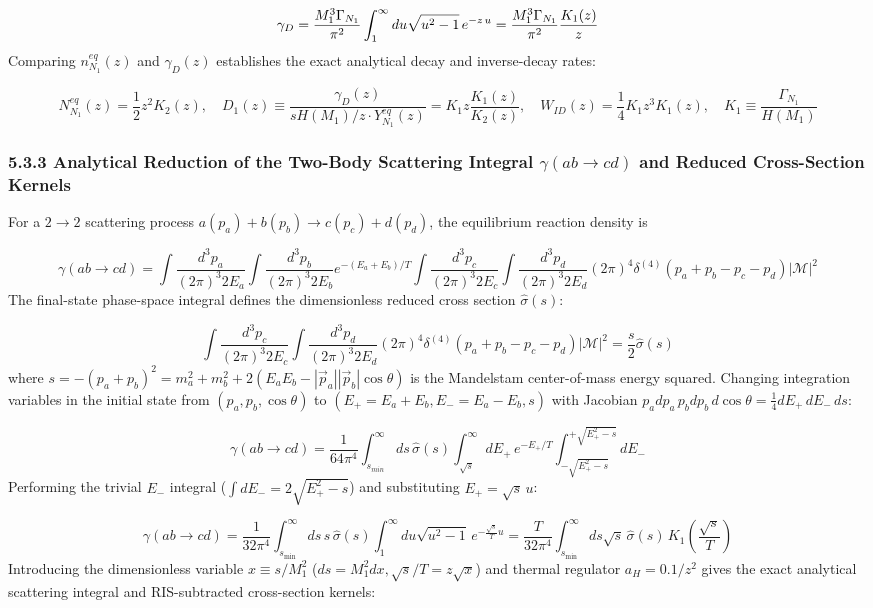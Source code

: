 \documentclass[aps,prd,onecolumn,superscriptaddress,nofootinbib,longbibliography,10pt]{revtex4-2}
\begin{document}
  \[ \gamma_D = \frac{M_1^3\Gamma_{N_1}}{\pi^2}\int_1^\infty du\sqrt{u^2 - 1}\,e^{{\small -z\,u}} = \frac{M_1^3\Gamma_{N_1}}{\pi^2}\frac{K_1(z)}{z} \]
  Comparing \(n_{N_1}^{eq}(z)\) and \(\gamma_D(z)\) establishes the exact analytical decay and inverse-decay rates:


  \[ N_{N_1}^{eq}(z) = \frac{1}{2}z^2 K_2(z), \quad D_1(z) \equiv \frac{\gamma_D(z)}{sH(M_1)/z\cdot Y_{N_1}^{eq}(z)} = K_1 z\frac{K_1(z)}{K_2(z)}, \quad W_{ID}(z) = \frac{1}{4}K_1 z^3 K_1(z), \quad K_1 \equiv \frac{\Gamma_{N_1}}{H(M_1)} \]

  
\subsubsection*{5.3.3 Analytical Reduction of the Two-Body Scattering Integral \(\gamma(ab \to cd)\) and Reduced Cross-Section Kernels}

  For a \(2 \to 2\) scattering process \(a(p_a) + b(p_b) \to c(p_c) + d(p_d)\), the equilibrium reaction density is


  \[ \gamma(ab \to cd) = \int\frac{d^3p_a}{(2\pi)^3 2E_a}\int\frac{d^3p_b}{(2\pi)^3 2E_b}e^{-(E_a+E_b)/T}\int\frac{d^3p_c}{(2\pi)^3 2E_c}\int\frac{d^3p_d}{(2\pi)^3 2E_d}(2\pi)^4\delta^{(4)}(p_a + p_b - p_c - p_d)|\mathcal{M}|^2 \]
  The final-state phase-space integral defines the dimensionless reduced cross section \(\hat{\sigma}(s)\):


  \[ \int\frac{d^3p_c}{(2\pi)^3 2E_c}\int\frac{d^3p_d}{(2\pi)^3 2E_d}(2\pi)^4\delta^{(4)}(p_a + p_b - p_c - p_d)|\mathcal{M}|^2 = \frac{s}{2}\hat{\sigma}(s) \]
  where \(s = -(p_a + p_b)^2 = m_a^2 + m_b^2 + 2(E_a E_b - |\vec{p}_a||\vec{p}_b|\cos\theta)\) is the Mandelstam center-of-mass energy squared. Changing integration variables in the initial state from \((p_a, p_b, \cos\theta)\) to \((E_+ = E_a + E_b, E_- = E_a - E_b, s)\) with Jacobian \(p_a dp_a\,p_b dp_b\,d\cos\theta = \frac{1}{4}dE_+\,dE_-\,ds\):


  \[ \gamma(ab \to cd) = \frac{1}{64\pi^4} \int_{s_{min}}^{\infty} ds \, \hat{\sigma}(s) \int_{\sqrt{s}}^{\infty} dE_{+} \, e^{-E_{+}/T} \int_{{-\sqrt{E_{{\mathbf{+}}}^2 - s}}}^{{+\sqrt{E_{{\mathbf{+}}}^2 - s}}} dE_{-} \]
  Performing the trivial \(E_-\) integral (\(\int dE_{-} = 2\sqrt{E_{{\mathbf{+}}}^2 - s}\)) and substituting \(E_+ = \sqrt{s}\,u\):


  \[ \gamma(ab \to cd) = \frac{1}{32\pi^4}\int_{s_{\min}}^\infty ds\,s\,\hat{\sigma}(s)\int_1^\infty du\sqrt{u^2 - 1}\,e^{-\frac{\sqrt{s}}{T}u} = \frac{T}{32\pi^4}\int_{s_{\min}}^\infty ds\sqrt{s}\,\hat{\sigma}(s)\,K_1\left(\frac{\sqrt{s}}{T}\right) \]
  Introducing the dimensionless variable \(x \equiv s/M_1^2\) (\(ds = M_1^2 dx, \sqrt{s}/T = z\sqrt{x}\)) and thermal regulator \(a_H = 0.1/z^2\) gives the exact analytical scattering integral and RIS-subtracted cross-section kernels:
\end{document}
